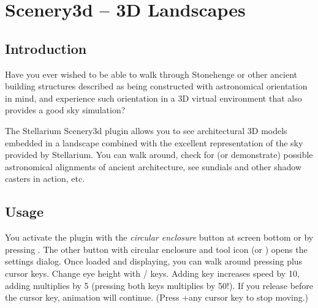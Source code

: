 
\chapter{Scenery3d -- 3D Landscapes}
\label{ch:scenery3d}


\section{Introduction}
\label{sec:scenery3d:Introduction}


Have you ever wished to be able to walk through Stonehenge or other
ancient building structures described as being constructed with
astronomical orientation in mind, and experience such orientation in a
3D virtual environment that also provides a good sky simulation?

The Stellarium Scenery3d plugin allows you to see architectural 3D models
embedded in a landscape combined with the excellent representation of the sky
provided by Stellarium. You can walk around, check for (or
demonstrate) possible astronomical alignments of ancient architecture, see
sundials and other shadow casters in action, etc.

\section{Usage}
\label{sec:scenery3d:Usage}


You activate the plugin with the \emph{circular enclosure} button  at screen
bottom or by pressing . The other button with circular enclosure and
tool icon   (or ) opens the settings dialog. Once loaded and
displaying, you can walk around pressing \key{\ctrl} plus cursor keys. Change eye
height with / keys. Adding \key{\shift} key increases speed by 10,
adding \key{\Alt} multiplies by 5 (pressing both keys multiplies by 50!). If you release \key{\ctrl} before
the cursor key, animation will continue. (Press \key{\ctrl}+any cursor key to stop
moving.)

